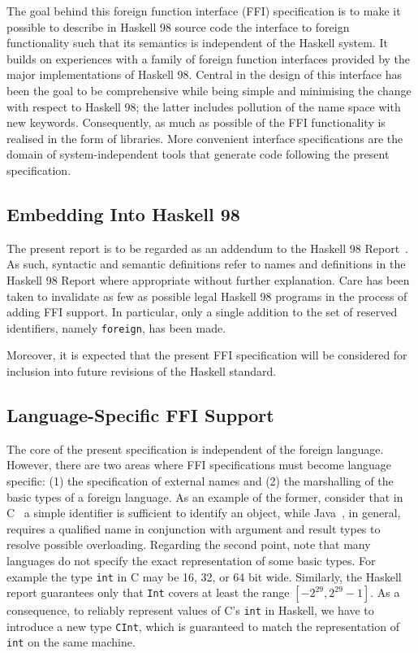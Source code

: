 \documentclass[a4paper,twosides]{article}
\newcommand{\code}[1]{\texttt{#1}}      %
\begin{document}
The goal behind this foreign function interface (FFI) specification is to make
it possible to describe in Haskell 98 source code the interface to foreign
functionality such that its semantics is independent of the Haskell system.
It builds on experiences with a family of foreign function interfaces provided
by the major implementations of Haskell 98.  Central in the design of this
interface has been the goal to be comprehensive while being simple and
minimising the change with respect to Haskell 98; the latter includes
pollution of the name space with new keywords.  Consequently, as much as
possible of the FFI functionality is realised in the form of libraries.  More
convenient interface specifications are the domain of system-independent tools
that generate code following the present specification.

\subsection{Embedding Into Haskell 98}

The present report is to be regarded as an addendum to the Haskell 98
Report~\cite{haskell98}.  As such, syntactic and semantic definitions refer to
names and definitions in the Haskell 98 Report where appropriate without
further explanation.  Care has been taken to invalidate as few as possible
legal Haskell 98 programs in the process of adding FFI support.  In
particular, only a single addition to the set of reserved identifiers, namely
\code{foreign}, has been made.

Moreover, it is expected that the present FFI specification will be considered
for inclusion into future revisions of the Haskell standard.

\subsection{Language-Specific FFI Support}

The core of the present specification is independent of the foreign language.
However, there are two areas where FFI specifications must become language
specific: (1) the specification of external names and (2) the marshalling of
the basic types of a foreign language.  As an example of the former, consider
that in C~\cite{C} a simple identifier is sufficient to identify an object,
while Java~\cite{gosling-etal:Java}, in general, requires a qualified name in
conjunction with argument and result types to resolve possible overloading.
Regarding the second point, note that many languages do not specify the exact
representation of some basic types.  For example the type \code{int} in C may
be 16, 32, or 64 bit wide.  Similarly, the Haskell report guarantees only that
\code{Int} covers at least the range \([-2^{29}, 2^{29} - 1]\).  As a
consequence, to reliably represent values of C's \code{int} in Haskell, we
have to introduce a new type \code{CInt}, which is guaranteed to match the
representation of \code{int} on the same machine.
\end{document}
